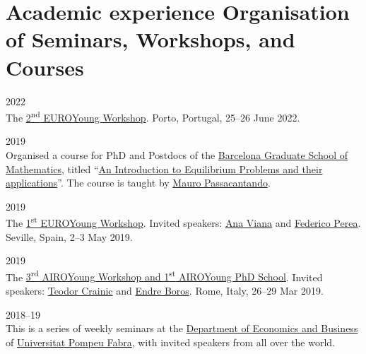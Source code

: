 \section*{Academic experience {\small Organisation of Seminars, Workshops, and Courses}}

\begin{paracol}{2}
  2022
\switchcolumn
  \\
  The \href{https://euroyoung.github.io/workshop20.html}{2\textsuperscript{nd} EUROYoung Workshop}.
  Porto, Portugal, 25--26 June 2022.
\end{paracol}

\begin{paracol}{2}
  2019
\switchcolumn
  \\
  Organised a course for PhD and Postdocs of the \href{https://www.bgsmath.cat/}{Barcelona Graduate School of Mathematics}, titled ``\href{https://web.archive.org/web/20190115064545/https://bgsmath.cat/event/introduction-equilibrium-problems-applications/}{An Introduction to Equilibrium Problems and their applications}''.
  The course is taught by \href{https://scholar.google.com/citations?user=GEtI8UUAAAAJ}{Mauro Passacantando}.
\end{paracol}

\begin{paracol}{2}
  2019
\switchcolumn
  \\
  The \href{https://euroyoung.github.io/workshop19.html}{1\textsuperscript{st} EUROYoung Workshop}.
  Invited speakers: \href{https://scholar.google.it/citations?user=RW7QevYAAAAJ}{Ana Viana} and \href{https://scholar.google.com/citations?user=DzigbIgAAAAJ}{Federico Perea}.
  Seville, Spain, 2--3 May 2019.
\end{paracol}

\begin{paracol}{2}
  2019
\switchcolumn
  \\
  The \href{https://workshop.airoyoung.org/2019}{3\textsuperscript{rd} AIROYoung Workshop and 1\textsuperscript{st} AIROYoung PhD School}.
  Invited speakers: \href{https://scholar.google.it/citations?user=C_zcTIAAAAAJ}{Teodor Crainic} and \href{https://scholar.google.it/citations?user=ok_1EXwAAAAJ}{Endre Boros}.
  Rome, Italy, 26--29 Mar 2019.
\end{paracol}

\begin{paracol}{2}
  2018--19
\switchcolumn
  \\
  This is a series of weekly seminars at the \href{https://www.upf.edu/web/econ/}{Department of Economics and Business} of \href{https://www.upf.edu/}{Universitat Pompeu Fabra}, with invited speakers from all over the world.
\end{paracol}

